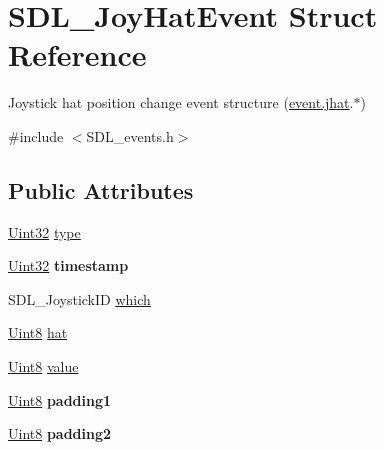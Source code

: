 \hypertarget{structSDL__JoyHatEvent}{}\section{S\+D\+L\+\_\+\+Joy\+Hat\+Event Struct Reference}
\label{structSDL__JoyHatEvent}


Joystick hat position change event structure (\hyperlink{unionSDL__Event_a421b40e0f8e01f181c8d5548cff1dd1d}{event.\+jhat}.$\ast$)  




{\ttfamily \#include $<$S\+D\+L\+\_\+events.\+h$>$}

\subsection*{Public Attributes}
\begin{DoxyCompactItemize}
\item 
\hyperlink{SDL__stdinc_8h_add440eff171ea5f55cb00c4a9ab8672d}{Uint32} \hyperlink{structSDL__JoyHatEvent_ac583dafab46c44354e210a542aff57cc}{type}
\item 
\hypertarget{structSDL__JoyHatEvent_ade58ecb3e75aad4ef9809f040519a021}{}\hyperlink{SDL__stdinc_8h_add440eff171ea5f55cb00c4a9ab8672d}{Uint32} {\bfseries timestamp}\label{structSDL__JoyHatEvent_ade58ecb3e75aad4ef9809f040519a021}

\item 
S\+D\+L\+\_\+\+Joystick\+I\+D \hyperlink{structSDL__JoyHatEvent_ac9d9bb179f9116d16b3da47cacd74b55}{which}
\item 
\hyperlink{SDL__stdinc_8h_a2944638813a090aa23e62f4da842c3e2}{Uint8} \hyperlink{structSDL__JoyHatEvent_ab1b54a6d1091e583e856f86b5af1e2f6}{hat}
\item 
\hyperlink{SDL__stdinc_8h_a2944638813a090aa23e62f4da842c3e2}{Uint8} \hyperlink{structSDL__JoyHatEvent_a52b179a34407449941b61d988ca72ef4}{value}
\item 
\hypertarget{structSDL__JoyHatEvent_afbe72b6702cf7f70ccbe206737ab2e49}{}\hyperlink{SDL__stdinc_8h_a2944638813a090aa23e62f4da842c3e2}{Uint8} {\bfseries padding1}\label{structSDL__JoyHatEvent_afbe72b6702cf7f70ccbe206737ab2e49}

\item 
\hypertarget{structSDL__JoyHatEvent_adaca3e99773130ae456690ba83feb420}{}\hyperlink{SDL__stdinc_8h_a2944638813a090aa23e62f4da842c3e2}{Uint8} {\bfseries padding2}\label{structSDL__JoyHatEvent_adaca3e99773130ae456690ba83feb420}

\end{DoxyCompactItemize}


